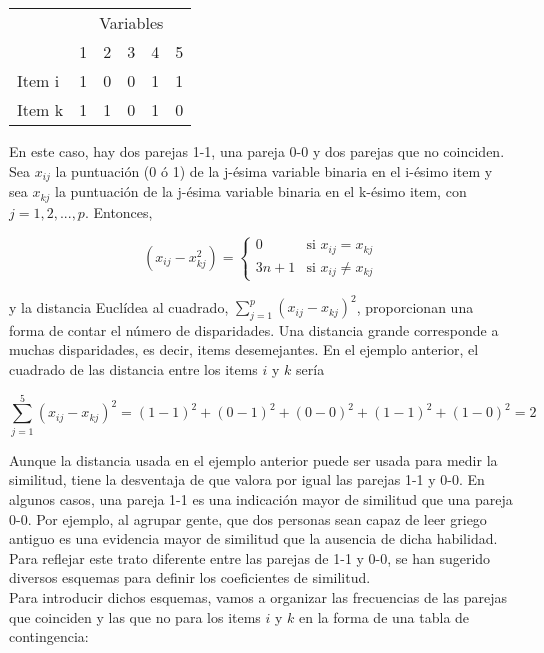 \documentclass[a4paper, 20pt]{article}
\begin{document}
\begin{table}[]
\begin{tabular}{llllll}
       & \multicolumn{5}{c}{Variables} \\
       & 1    & 2    & 3   & 4   & 5   \\
Item i & 1    & 0    & 0   & 1   & 1   \\
Item k & 1    & 1    & 0   & 1   & 0  
\end{tabular}
\end{table}

En este caso, hay dos parejas 1-1, una pareja 0-0 y dos parejas que no coinciden.\\

Sea $x_{ij}$ la puntuación (0 ó 1) de la j-ésima variable binaria en el i-ésimo item y sea $x_{kj}$ la puntuación de la j-ésima variable binaria en el k-ésimo item, con $j=1,2,...,p$. Entonces,

$$(x_{ij}-x_{kj}^2) = \left \{ \begin{matrix} 0 & \mbox{si } x_{ij}=x_{kj}
\\ 3n+1 & \mbox{si }x_{ij}\neq x_{kj}\end{matrix}\right.   $$

y la distancia Euclídea al cuadrado, $\sum_{j=1}^p{(x_{ij}-x_{kj})^2}$, proporcionan una forma de contar el número de disparidades. Una distancia grande corresponde a muchas disparidades, es decir, items desemejantes. En el ejemplo anterior, el cuadrado de las distancia entre los items $i$ y $k$ sería

$$\sum_{j=1}^5{(x_{ij}-x_{kj})^2}=(1-1)^2+(0-1)^2+(0-0)^2+(1-1)^2+(1-0)^2=2$$

Aunque la distancia usada en el ejemplo anterior puede ser usada para medir la similitud, tiene la desventaja de que valora por igual las parejas 1-1 y 0-0. En algunos casos, una pareja 1-1 es una indicación mayor de similitud que una pareja 0-0. Por ejemplo, al agrupar gente, que dos personas sean capaz de leer griego antiguo es una evidencia mayor de similitud que la ausencia de dicha habilidad. Para reflejar este trato diferente entre las parejas de 1-1 y 0-0, se han sugerido diversos esquemas para definir los coeficientes de similitud.\\
Para introducir dichos esquemas, vamos a organizar las frecuencias de las parejas que coinciden y las que no para los items $i$ y $k$ en la forma de una tabla de contingencia:

\end{document}

